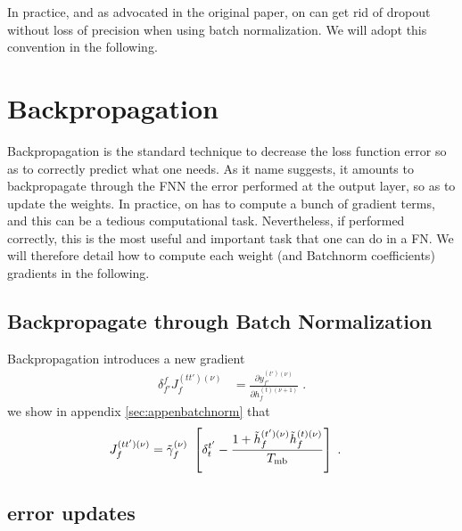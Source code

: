 In practice, and as advocated in the original paper, on can get rid of dropout without loss of precision when using batch normalization. We will adopt this convention in the following.


\section{Backpropagation}

Backpropagation\cite{LeCun:1998:EB:645754.668382} is the standard technique to decrease the loss function error so as to correctly predict what one needs. As it name suggests, it amounts to backpropagate through the FNN the error performed at the output layer, so as to update the weights. In practice, on has to compute a bunch of gradient terms, and this can be a tedious computational task. Nevertheless, if performed correctly, this is the most useful and important task that one can do in a FN. We will therefore detail how to compute each weight (and Batchnorm coefficients) gradients in the following.

\subsection{Backpropagate through Batch Normalization} \label{sec:Backpropbatchnorm}

Backpropagation introduces a new gradient
\begin{align}
\delta^f_{f'}J^{(tt')(\nu)}_{f}&=\frac{\partial y^{(t')(\nu)}_{f'}}{\partial h_{f}^{(t)(\nu+1)}}\;.
\end{align}
we show in appendix \ref{sec:appenbatchnorm} that
\begin{align}
J^{(tt')(\nu)}_{f}&=\tilde{\gamma}^{(\nu)}_f\ \left[\delta^{t'}_t-
%
\frac{1+\tilde{h}_{f}^{(t')(\nu)}\tilde{h}_{f}^{(t)(\nu)}}{T_{{\rm mb}}}\right]\;.
\end{align}


\subsection{error updates}


